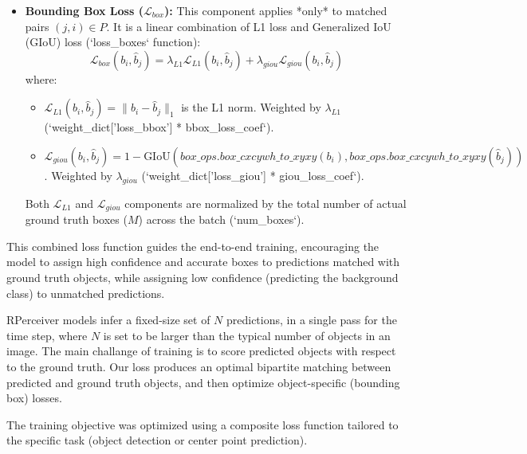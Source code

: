 \begin{itemize}
\begin{itemize}
    \item \textbf{Bounding Box Loss ($ \mathcal{L}_{box} $):} This component applies *only* to matched pairs $ (j, i) \in P $. It is a linear combination of L1 loss and Generalized IoU (GIoU) loss (`loss_boxes` function):
    \begin{equation}
        \mathcal{L}_{box}(b_i, \hat{b}_j) = \lambda_{L1} \mathcal{L}_{L1}(b_i, \hat{b}_j) + \lambda_{giou} \mathcal{L}_{giou}(b_i, \hat{b}_j)
        \label{eq:box_loss_revised}
    \end{equation}
    where:
        \begin{itemize}
            \item $ \mathcal{L}_{L1}(b_i, \hat{b}_j) = \|b_i - \hat{b}_j\|_1 $ is the L1 norm. Weighted by $ \lambda_{L1} $ (`weight_dict['loss_bbox'] * bbox_loss_coef`).
            \item $ \mathcal{L}_{giou}(b_i, \hat{b}_j) = 1 - \text{GIoU}(box\_ops.box\_cxcywh\_to\_xyxy(b_i), box\_ops.box\_cxcywh\_to\_xyxy(\hat{b}_j)) $. Weighted by $ \lambda_{giou} $ (`weight_dict['loss_giou'] * giou_loss_coef`).
        \end{itemize}
        Both $ \mathcal{L}_{L1} $ and $ \mathcal{L}_{giou} $ components are normalized by the total number of actual ground truth boxes ($M$) across the batch (`num_boxes`).
\end{itemize}
This combined loss function guides the end-to-end training, encouraging the model to assign high confidence and accurate boxes to predictions matched with ground truth objects, while assigning low confidence (predicting the background class) to unmatched predictions.




RPerceiver models infer a fixed-size set of $N$ predictions, in a single pass for the time step, where $N$ is set to be larger than the typical number of objects in an image. The main challange of training is to score predicted objects with respect to the ground truth. Our loss produces an optimal bipartite matching between predicted and ground truth objects, and then optimize object-specific (bounding box) losses.

The training objective was optimized using a composite loss function tailored to the specific task (object detection or center point prediction).


\end{itemize}
